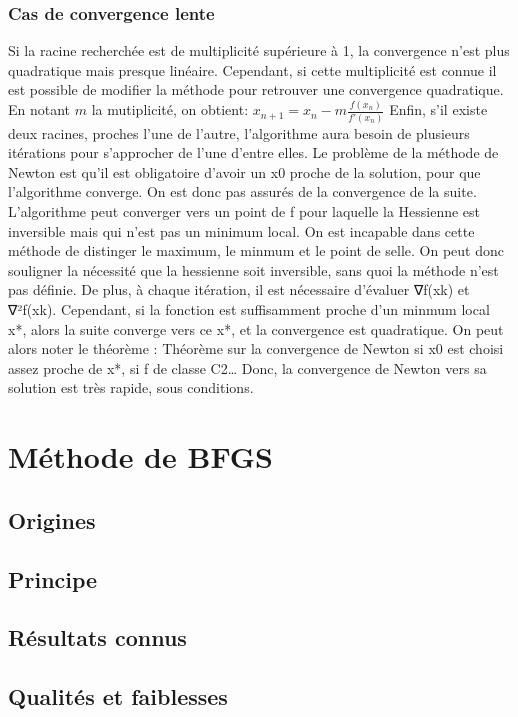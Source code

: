 \documentclass[3p, twocolumn]{elsarticle}
\begin{document}
\subsubsection{Cas de convergence lente}
Si la racine recherchée est de multiplicité supérieure à 1, la convergence n'est plus quadratique mais presque linéaire. Cependant, si cette multiplicité est connue il est possible de modifier la méthode pour retrouver une convergence quadratique. En notant $m$ la mutiplicité, on obtient:
\newline
$x_{n+1}=x_{n}-m\frac{f(x_{n})}{f'(x_{n})}$
\newline
Enfin, s'il existe deux racines, proches l'une de l'autre, l'algorithme aura besoin de plusieurs itérations pour s'approcher de l'une d'entre elles.
Le problème de la méthode de Newton est qu’il est obligatoire d’avoir un x0 proche de la solution, pour que l’algorithme converge. On est donc pas assurés de la convergence de la suite. 
L’algorithme peut converger vers un point de f pour laquelle la Hessienne est inversible mais qui n’est pas un minimum local. On est incapable dans cette méthode de distinger le maximum, le minmum et le point de selle.
On peut donc souligner la nécessité que la hessienne soit inversible, sans quoi la méthode n’est pas définie. 
De plus, à chaque itération, il est nécessaire d’évaluer ∇f(xk) et ∇²f(xk). 
Cependant, si la fonction est suffisamment proche d’un minmum local x*, alors la suite converge vers ce x*, et la convergence est quadratique. On peut alors noter le théorème : 
Théorème sur la convergence de Newton si x0 est choisi assez proche de x*, si f de classe C2… 
Donc, la convergence de Newton vers sa solution est très rapide, sous conditions.

\section{Méthode de BFGS}
\subsection{Origines}
\subsection{Principe}
\subsection{Résultats connus}
\subsection{Qualités et faiblesses}
\end{document}

